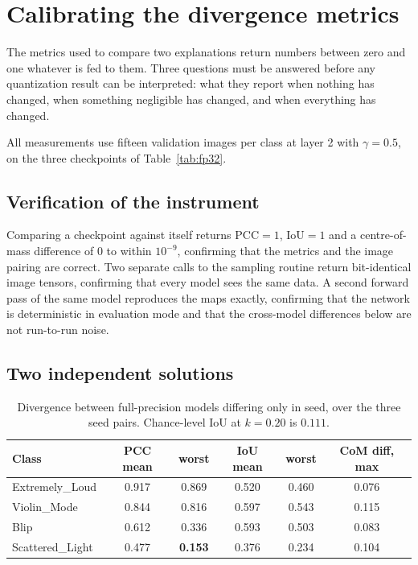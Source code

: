 \section{Calibrating the divergence metrics}
\label{sec:calibration}

The metrics used to compare two explanations return numbers between zero and one
whatever is fed to them. Three questions must be answered before any quantization
result can be interpreted: what they report when nothing has changed, when
something negligible has changed, and when everything has changed.

All measurements use fifteen validation images per class at layer 2 with
$\gamma = 0.5$, on the three checkpoints of Table~\ref{tab:fp32}.

\subsection{Verification of the instrument}

Comparing a checkpoint against itself returns $\mathrm{PCC} = 1$,
$\mathrm{IoU} = 1$ and a centre-of-mass difference of $0$ to within $10^{-9}$,
confirming that the metrics and the image pairing are correct. Two separate calls
to the sampling routine return bit-identical image tensors, confirming that every
model sees the same data. A second forward pass of the same model reproduces the
maps exactly, confirming that the network is deterministic in evaluation mode and
that the cross-model differences below are not run-to-run noise.

\subsection{Two independent solutions}

\begin{table}[htbp]
\centering
\begin{tabular}{lccccc}
\toprule
Class & PCC mean & worst & IoU mean & worst & CoM diff, max \\
\midrule
Extremely\_Loud & 0.917 & 0.869 & 0.520 & 0.460 & 0.076 \\
Violin\_Mode & 0.844 & 0.816 & 0.597 & 0.543 & 0.115 \\
Blip & 0.612 & 0.336 & 0.593 & 0.503 & 0.083 \\
Scattered\_Light & 0.477 & \textbf{0.153} & 0.376 & 0.234 & 0.104 \\
\bottomrule
\end{tabular}
\caption{Divergence between full-precision models differing only in seed, over
the three seed pairs. Chance-level IoU at $k = 0.20$ is $0.111$.}
\label{tab:seeds}
\end{table}

